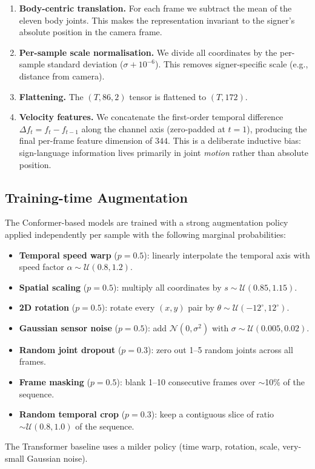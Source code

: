 \documentclass[11pt,a4paper]{article}
\begin{document}
\begin{enumerate}
  \item \textbf{Body-centric translation.} For each frame we subtract the mean of the eleven body joints. This makes the representation invariant to the signer's absolute position in the camera frame.
  \item \textbf{Per-sample scale normalisation.} We divide all coordinates by the per-sample standard deviation ($\sigma + 10^{-6}$). This removes signer-specific scale (e.g., distance from camera).
  \item \textbf{Flattening.} The $(T,86,2)$ tensor is flattened to $(T, 172)$.
  \item \textbf{Velocity features.} We concatenate the first-order temporal difference $\Delta f_t = f_t - f_{t-1}$ along the channel axis (zero-padded at $t=1$), producing the final per-frame feature dimension of $344$. This is a deliberate inductive bias: sign-language information lives primarily in joint \emph{motion} rather than absolute position.
\end{enumerate}

\subsection{Training-time Augmentation}
The Conformer-based models are trained with a strong augmentation policy applied independently per sample with the following marginal probabilities:
\begin{itemize}
  \item \textbf{Temporal speed warp} ($p=0.5$): linearly interpolate the temporal axis with speed factor $\alpha \sim \mathcal{U}(0.8, 1.2)$.
  \item \textbf{Spatial scaling} ($p=0.5$): multiply all coordinates by $s \sim \mathcal{U}(0.85, 1.15)$.
  \item \textbf{2D rotation} ($p=0.5$): rotate every $(x,y)$ pair by $\theta \sim \mathcal{U}(-12^\circ, 12^\circ)$.
  \item \textbf{Gaussian sensor noise} ($p=0.5$): add $\mathcal{N}(0,\sigma^2)$ with $\sigma \sim \mathcal{U}(0.005, 0.02)$.
  \item \textbf{Random joint dropout} ($p=0.3$): zero out 1--5 random joints across all frames.
  \item \textbf{Frame masking} ($p=0.5$): blank 1--10 consecutive frames over $\sim$10\% of the sequence.
  \item \textbf{Random temporal crop} ($p=0.3$): keep a contiguous slice of ratio $\sim \mathcal{U}(0.8, 1.0)$ of the sequence.
\end{itemize}
The Transformer baseline uses a milder policy (time warp, rotation, scale, very-small Gaussian noise).
\end{document}
